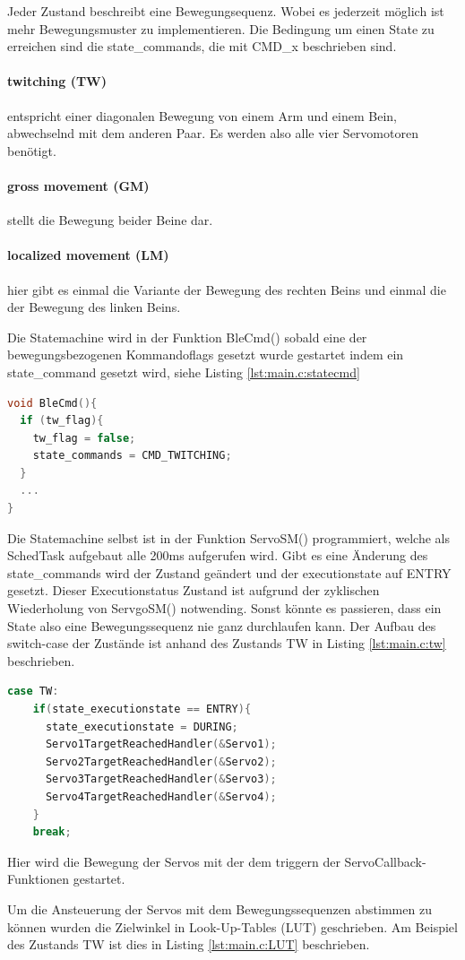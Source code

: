 \newpage
\noindent
Jeder Zustand beschreibt eine Bewegungsequenz. Wobei es jederzeit möglich ist mehr Bewegungsmuster zu implementieren. Die Bedingung um einen State zu erreichen sind die 
state\_commands, die mit CMD\_x beschrieben sind. 

\paragraph{twitching (TW)} entspricht einer diagonalen Bewegung von einem Arm und einem Bein, abwechselnd mit dem anderen Paar. Es werden also alle vier Servomotoren benötigt.
\paragraph{gross movement (GM)} stellt die Bewegung beider Beine dar. 
\paragraph{localized movement (LM)} hier gibt es einmal die Variante der Bewegung des rechten Beins und einmal die der Bewegung des linken Beins. 

\par\vspace{1em}
\noindent
Die Statemachine wird in der Funktion BleCmd() sobald eine der bewegungsbezogenen Kommandoflags gesetzt wurde gestartet indem ein state\_command gesetzt wird, siehe 
Listing \ref{lst:main.c:statecmd}
\begin{lstlisting}[language=C++, caption={setzten des state\_commands}, label={lst:main.c:statecmd}, firstnumber=223]
void BleCmd(){
  if (tw_flag){
    tw_flag = false; 
    state_commands = CMD_TWITCHING; 
  }
  ...
}
\end{lstlisting} 
\noindent 
Die Statemachine selbst ist in der Funktion ServoSM() programmiert, welche als SchedTask aufgebaut alle 200ms 
aufgerufen wird. Gibt es eine Änderung des state\_commands wird der Zustand geändert und der executionstate auf ENTRY gesetzt. 
Dieser Executionstatus Zustand ist aufgrund der zyklischen Wiederholung von ServgoSM() notwending.
Sonst könnte es passieren, dass ein State also eine Bewegungssequenz nie ganz durchlaufen kann. 
\noindent
Der Aufbau des switch-case der Zustände ist anhand des Zustands TW in Listing \ref{lst:main.c:tw} beschrieben. 
\begin{lstlisting}[language=C++, caption={Was passiert bei einem Bewegungszustand?}, label={lst:main.c:tw}, firstnumber=454]
    case TW:
    if(state_executionstate == ENTRY){
      state_executionstate = DURING;
      Servo1TargetReachedHandler(&Servo1); 
      Servo2TargetReachedHandler(&Servo2); 
      Servo3TargetReachedHandler(&Servo3); 
      Servo4TargetReachedHandler(&Servo4); 
    }
    break; 
\end{lstlisting}
\noindent 
Hier wird die Bewegung der Servos mit der dem triggern der ServoCallback-Funktionen gestartet.
\par\vspace{1em}
\noindent
Um die Ansteuerung der Servos mit dem Bewegungssequenzen
abstimmen zu können wurden die Zielwinkel in Look-Up-Tables (LUT) geschrieben. Am Beispiel des Zustands TW ist dies in Listing \ref{lst:main.c:LUT} beschrieben. 

